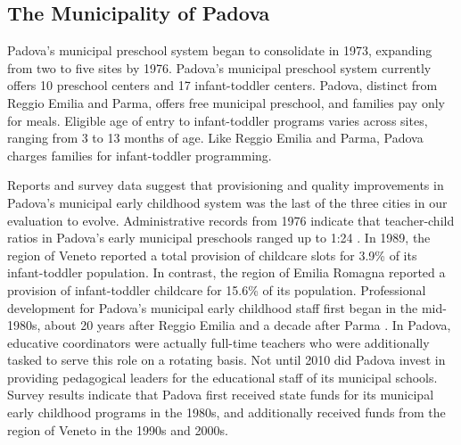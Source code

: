 \subsection{The Municipality of Padova}

Padova's municipal preschool system began to consolidate in 1973, expanding from two to five sites by 1976. Padova's municipal preschool system currently offers 10 preschool centers and 17 infant-toddler centers. Padova, distinct from Reggio Emilia and Parma, offers free municipal preschool, and families pay only for meals. Eligible age of entry to infant-toddler programs varies across sites, ranging from 3 to 13 months of age. Like Reggio Emilia and Parma, Padova charges families for infant-toddler programming. 

Reports and survey data suggest that provisioning and quality improvements in Padova's municipal early childhood system was the last of the three cities in our evaluation to evolve. Administrative records from 1976 indicate that teacher-child ratios in Padova's early municipal preschools ranged up to 1:24 \citep{Padova-Admin-Data_1964-2011,CEHD_2016_Historical-Analysis}. In 1989, the region of Veneto reported a total provision of childcare slots for 3.9\% of its infant-toddler population. In contrast, the region of Emilia Romagna reported a provision of infant-toddler childcare for 15.6\% of its population. Professional development for Padova's municipal early childhood staff first began in the mid-1980s, about 20 years after Reggio Emilia and a decade after Parma \citep{Becchi-Ferrari_1990_Pub-Inf-Centres-Italy,CEHD_2016_Historical-Analysis}. In Padova, educative coordinators were actually full-time teachers who were additionally tasked to serve this role on a rotating basis. Not until 2010 did Padova invest in providing pedagogical leaders for the educational staff of its municipal schools. Survey results indicate that Padova first received state funds for its municipal early childhood programs in the 1980s, and additionally received funds from the region of Veneto in the 1990s and 2000s. 

